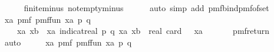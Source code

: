 \begin{isabellebody}
\ \ \ \ \isamarkupfalse%
\ finite{\isacharunderscore}{\kern0pt}minus\ not{\isacharunderscore}{\kern0pt}empty{\isacharunderscore}{\kern0pt}minus\isanewline
\ \ \ \ \isamarkupfalse%
\ {\isacharparenleft}{\kern0pt}auto\ simp\ add{\isacharcolon}{\kern0pt}\ pmf{\isacharunderscore}{\kern0pt}bind{\isacharunderscore}{\kern0pt}pmf{\isacharunderscore}{\kern0pt}of{\isacharunderscore}{\kern0pt}set{\isacharparenright}{\kern0pt}\isanewline
\isanewline
\ \ \isamarkupfalse%
\ \isamarkupfalse%
\ {\isachardoublequoteopen}{\isacharparenleft}{\kern0pt}{\isasymSum}xa{\isasymin}{\isasymK}{\isachardot}{\kern0pt}\ pmf\ {\isacharparenleft}{\kern0pt}{\isacharquery}{\kern0pt}pmf{\isacharunderscore}{\kern0pt}fun\ xa{\isacharparenright}{\kern0pt}\ {\isacharparenleft}{\kern0pt}p{\isacharcomma}{\kern0pt}\ q{\isacharparenright}{\kern0pt}{\isacharparenright}{\kern0pt}\ {\isacharequal}{\kern0pt}\isanewline
\ \ \ \ {\isacharparenleft}{\kern0pt}{\isasymSum}xa{\isasymin}{\isasymK}{\isachardot}{\kern0pt}\ {\isacharparenleft}{\kern0pt}{\isasymSum}xb{\isasymin}{\isacharparenleft}{\kern0pt}{\isasymK}\ {\isacharminus}{\kern0pt}\ {\isacharbraceleft}{\kern0pt}xa{\isacharbraceright}{\kern0pt}{\isacharparenright}{\kern0pt}{\isachardot}{\kern0pt}\ {\isacharparenleft}{\kern0pt}indicat{\isacharunderscore}{\kern0pt}real\ {\isacharbraceleft}{\kern0pt}{\isacharparenleft}{\kern0pt}p{\isacharcomma}{\kern0pt}\ q{\isacharparenright}{\kern0pt}{\isacharbraceright}{\kern0pt}\ {\isacharparenleft}{\kern0pt}xa{\isacharcomma}{\kern0pt}\ xb{\isacharparenright}{\kern0pt}{\isacharparenright}{\kern0pt}{\isacharparenright}{\kern0pt}\ {\isacharslash}{\kern0pt}\ real\ {\isacharparenleft}{\kern0pt}card\ {\isacharparenleft}{\kern0pt}{\isasymK}\ {\isacharminus}{\kern0pt}\ {\isacharbraceleft}{\kern0pt}xa{\isacharbraceright}{\kern0pt}{\isacharparenright}{\kern0pt}{\isacharparenright}{\kern0pt}{\isacharparenright}{\kern0pt}{\isachardoublequoteclose}\ \isanewline
\ \ \ \ \isamarkupfalse%
\ pmf{\isacharunderscore}{\kern0pt}return\isanewline
\ \ \ \ \isamarkupfalse%
\ auto\isanewline
\isanewline
\ \ \isamarkupfalse%
\ \isamarkupfalse%
\ {\isachardoublequoteopen}{\isacharparenleft}{\kern0pt}{\isasymSum}xa{\isasymin}{\isasymK}{\isachardot}{\kern0pt}\ pmf\ {\isacharparenleft}{\kern0pt}{\isacharquery}{\kern0pt}pmf{\isacharunderscore}{\kern0pt}fun\ xa{\isacharparenright}{\kern0pt}\ {\isacharparenleft}{\kern0pt}p{\isacharcomma}{\kern0pt}\ q{\isacharparenright}{\kern0pt}{\isacharparenright}{\kern0pt}\ {\isacharequal}{\kern0pt}\isanewline

\end{isabellebody}
